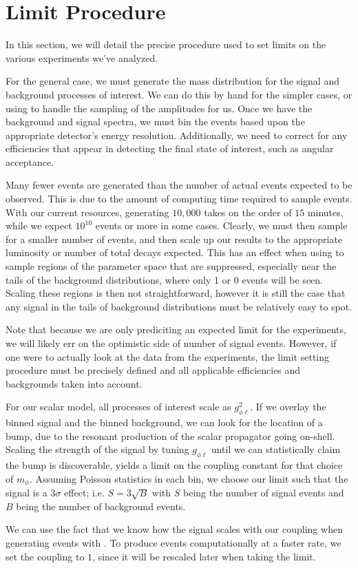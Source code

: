 \section{Limit Procedure}
In this section, we will detail the precise procedure used to set limits on the various experiments we've analyzed.

For the general case, we must generate the mass distribution for the signal and background processes of interest.
We can do this by hand for the simpler cases, or using \madgraph to handle the sampling of the amplitudes for us.
Once we have the background and signal spectra, we must bin the events based upon the appropriate detector's energy resolution.
Additionally, we need to correct for any efficiencies that appear in detecting the final state of interest, such as angular acceptance.

Many fewer events are generated than the number of actual events expected to be observed.
This is due to the amount of computing time required to sample events.
With our current resources, generating $10,000$ takes on the order of $15$ minutes, while we expect $10^{10}$ events or more in some cases.
Clearly, we must then sample for a smaller number of events, and then scale up our results to the appropriate luminosity or number of total decays expected.
This has an effect when using \madgraph to sample regions of the parameter space that are suppressed, especially near the tails of the background distributions, where only 1 or 0 events will be seen.
Scaling these regions is then not straightforward, however it is still the case that any signal in the tails of background distributions must be relatively easy to spot.

Note that because we are only prediciting an expected limit for the experiments, we will likely err on the optimistic side of number of signal events.
However, if one were to actually look at the data from the experiments, the limit setting procedure must be precisely defined and all applicable efficiencies and backgrounds taken into account.

For our scalar model, all processes of interest scale as $g_{\phi\ell}^2$.
If we overlay the binned signal and the binned background, we can look for the location of a bump, due to the resonant production of the scalar propagator going on-shell.
Scaling the strength of the signal by tuning $g_{\phi\ell}$ until we can statistically claim the bump is discoverable, yields a limit on the coupling constant for that choice of $m_\phi$.
Assuming Poisson statistics in each bin, we choose our limit such that the signal is a $3\sigma$ effect; i.e. $S = 3\sqrt{B}$ with $S$ being the number of signal events and $B$ being the number of background events.

We can use the fact that we know how the signal scales with our coupling when generating events with \madgraph.
To produce events computationally at a faster rate, we set the coupling to $1$, since it will be rescaled later when taking the limit.
